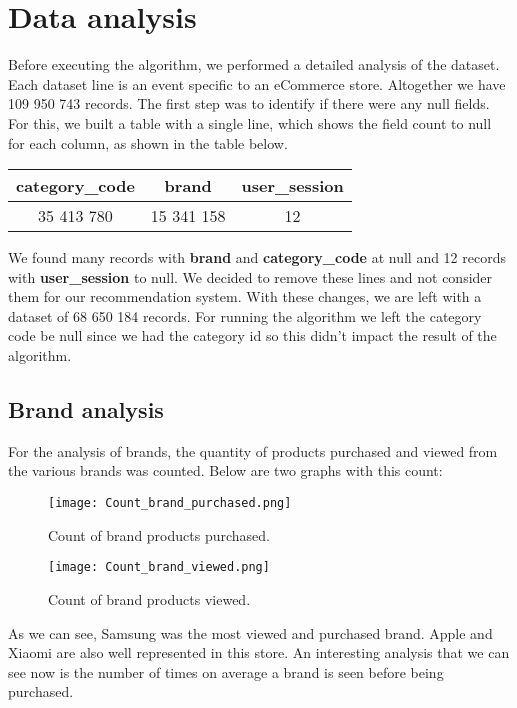 \section{Data analysis}
\label{data-analysis}

Before executing the algorithm, we performed a detailed analysis of the dataset.
Each dataset line is an event specific to an eCommerce store.
Altogether we have 109 950 743 records.
The first step was to identify if there were any null fields.
For this, we built a table with a single line, which shows the field count to null for each column, as shown in the table below.
\begin{center}
    \begin{tabular}{ | c | c | c | } 
        \hline
        \textbf{category\_code} & \textbf{brand} & \textbf{user\_session} \\ 
        \hline
        35 413 780 & 15 341 158 & 12 \\
        \hline
    \end{tabular}
\end{center}
We found many records with \textbf{brand} and \textbf{category\_code} at null and 12 records with \textbf{user\_session} to null.
We decided to remove these lines and not consider them for our recommendation system.
With these changes, we are left with a dataset of 68 650 184 records.
For running the algorithm we left the category code be null since we had the category id so this didn't impact the result of the algorithm.

\subsection{Brand analysis}
For the analysis of brands, the quantity of products purchased and viewed from the various brands was counted.
Below are two graphs with this count:

\begin{figure}[H]
    \centering
    \texttt{[image: Count\_brand\_purchased.png]}
    \caption{Count of brand products purchased.}
\end{figure}

\begin{figure}[H]
    \centering
    \texttt{[image: Count\_brand\_viewed.png]}
    \caption{Count of brand products viewed.}
\end{figure}

As we can see, Samsung was the most viewed and purchased brand.
Apple and Xiaomi are also well represented in this store.
An interesting analysis that we can see now is the number of times on average a brand is seen before being purchased.

